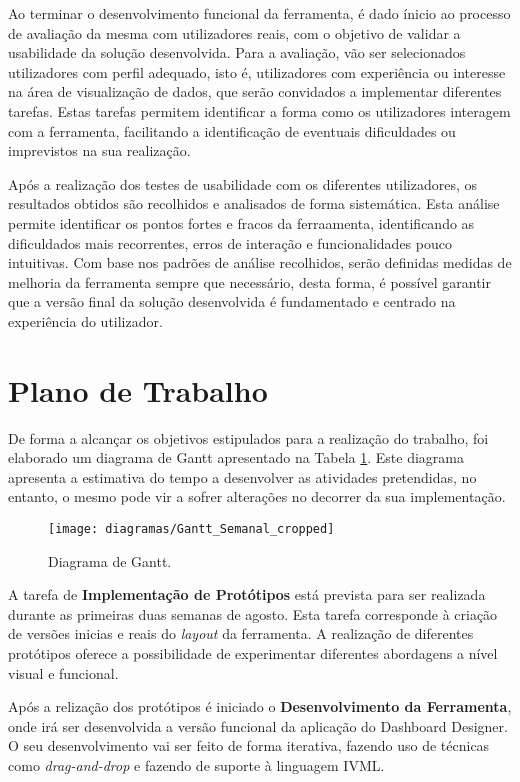 Ao terminar o desenvolvimento funcional da ferramenta, é dado ínicio ao processo de avaliação da mesma com utilizadores reais, com o objetivo de validar a usabilidade da solução desenvolvida. Para a avaliação, vão ser selecionados utilizadores com perfil adequado, isto é, utilizadores com experiência ou interesse na área de visualização de dados, que serão convidados a implementar diferentes tarefas. Estas tarefas permitem identificar a forma como os utilizadores interagem com a ferramenta, facilitando a identificação de eventuais dificuldades ou imprevistos na sua realização.

Após a realização dos testes de usabilidade com os diferentes utilizadores, os resultados obtidos são recolhidos e analisados de forma sistemática. Esta análise permite identificar os pontos fortes e fracos da ferraamenta, identificando as dificuldados mais recorrentes, erros de interação e funcionalidades pouco intuitivas. Com base nos padrões de análise recolhidos, serão definidas medidas de melhoria da ferramenta sempre que necessário, desta forma, é possível garantir que a versão final da solução desenvolvida é fundamentado e centrado na experiência do utilizador.

\section{Plano de Trabalho} %
\label{sec:plano_trabalho}

De forma a alcançar os objetivos estipulados para a realização do trabalho, foi elaborado um diagrama de Gantt apresentado na Tabela \ref{tab:ganttchart}. Este diagrama apresenta a estimativa do tempo a desenvolver as atividades pretendidas, no entanto, o mesmo pode vir a sofrer alterações no decorrer da sua implementação.

\begin{figure}[htbp]
  \texttt{[image: diagramas/Gantt\_Semanal\_cropped]}
  \centering
  \caption{Diagrama de Gantt.}
  \label{tab:ganttchart}
\end{figure}

A tarefa de \textbf{Implementação de Protótipos} está prevista para ser realizada durante as primeiras duas semanas de agosto. Esta tarefa corresponde à criação de versões inicias e reais do \textit{layout} da ferramenta. A realização de diferentes protótipos oferece a possibilidade de experimentar diferentes abordagens a nível visual e funcional.

Após a relização dos protótipos é iniciado o \textbf{Desenvolvimento da Ferramenta}, onde irá ser desenvolvida a versão funcional da aplicação do Dashboard Designer. O seu desenvolvimento vai ser feito de forma iterativa, fazendo uso de técnicas como \textit{drag-and-drop} e fazendo de suporte à linguagem \gls{IVML}.

